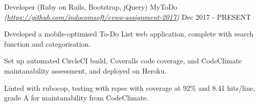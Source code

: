 

\begin{cventries}

	\cventry
		{Developer (Ruby on Rails, Bootstrap, jQuery)} %
		{MyToDo \textmd{\em\tiny(\url{https://github.com/indocomsoft/cvwo-assignment-2017})}} %
		{} %
		{Dec 2017 - PRESENT} %
		{
			\begin{cvitems} %
				\item {Developed a mobile-optimised To-Do List web application, complete with search function and categorisation.}
				\item {Set up automated CircleCI build, Coveralls code coverage, and CodeClimate maintanability assessment, and deployed on Heroku.}
				\item {Linted with rubocop, testing with rspec with coverage at 92\% and 8.41 hits/line, grade A for maintanability from CodeClimate.}
			\end{cvitems}
		}
		
    

\end{cventries}
